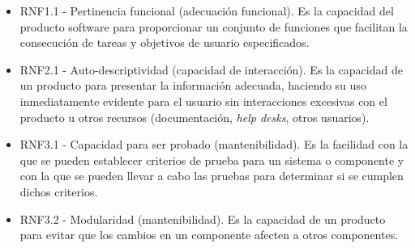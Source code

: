 \begin{itemize}
    \item RNF1.1 - Pertinencia funcional (adecuación funcional). Es la capacidad del producto software para proporcionar un conjunto de funciones que facilitan la consecución de tareas y objetivos de usuario especificados.

    \item RNF2.1 - Auto-descriptividad (capacidad de interacción). Es la capacidad de un producto para presentar la información adecuada, haciendo su uso inmediatamente evidente para el usuario sin interacciones excesivas con el producto u otros recursos (documentación, \textit{help desks}, otros usuarios).

    \item RNF3.1 - Capacidad para ser probado (mantenibilidad). Es la facilidad con la que se pueden establecer criterios de prueba para un sistema o componente y con la que se pueden llevar a cabo las pruebas para determinar si se cumplen dichos criterios.

    \item RNF3.2 - Modularidad (mantenibilidad). Es la capacidad de un producto para evitar que los cambios en un componente afecten a otros componentes.
\end{itemize}
